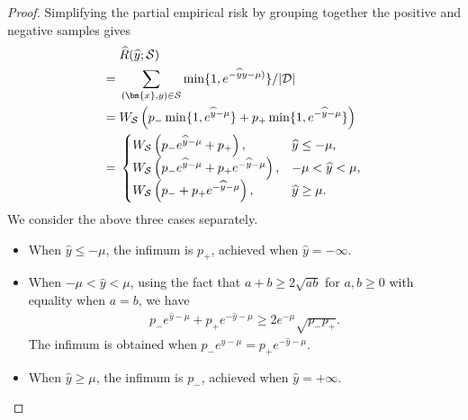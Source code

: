 \documentclass[letterpaper]{article} %
\newcommand{\bx}{{\bm{x}}}
\newcommand{\cS}{{\cal{S}}}
\newcommand{\cD}{{\cal{D}}}
\newcommand{\WS}{{W_{\cal{S}}}}
\begin{document}
\begin{proof}
    Simplifying the partial empirical risk by grouping together the positive and negative samples gives
    \begin{align*}
    &\; \widehat{R}(\widehat{y};\cS) \\
        =&\; \sum_{(\bx,y)\in\cS} \min\{1, e^{-\widehat{y}y-\mu)}\}/|\cD| \\
        =&\; \WS \left( 
                p_{-} \min\{1, e^{\widehat{y}-\mu}\}
                +
                p_{+} \min\{1,e^{-\widehat{y}-\mu}\}
                \right) \\
        =&\;
        \begin{cases} 
            \WS \left(p_{-} e^{\widehat{y}-\mu} + p_{+} \right), 
                & \widehat{y}\leq -\mu, \\
            \WS \left(p_{-} e^{\widehat{y} - \mu} + p_{+} e^{-\widehat{y}-\mu}\right), 
                & -\mu<\widehat{y}<\mu, \\
            \WS \left(p_{-} + p_{+} e^{-\widehat{y}-\mu}\right), 
                & \widehat{y}\geq \mu.
            \end{cases} 
    \end{align*}
    We consider the above three cases separately.
    \begin{itemize}
        \item When $\widehat{y} \leq -\mu$, the infimum is $p_{+}$, achieved when $\widehat{y} = -\infty$.
        \item When $-\mu<\widehat{y}<\mu$, using the fact that $a + b \ge 2\sqrt{ab}$ for
            $a, b \ge 0$ with equality when $a = b$, we have 
            \begin{align*}
                p_{-} e^{\widehat{y} - \mu} + p_{+} e^{-\widehat{y}-\mu}
                \ge 2 e^{-\mu} \sqrt{p_{-} p_{+}}.
            \end{align*}
            The infimum is obtained when 
            $p_{-} e^{\widehat{y} - \mu} = p_{+} e^{-\widehat{y}-\mu}$.
        \item
            When $\widehat{y} \geq \mu$, the infimum is $p_{-}$, achieved when
            $\widehat{y} = +\infty$.
    \end{itemize}


\end{proof}
\end{document}
